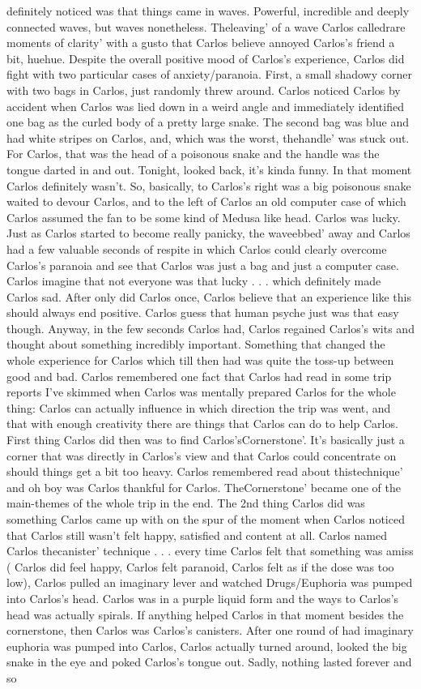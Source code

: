 \documentclass[12pt]{book}
\begin{document}
definitely noticed was that things came in waves. Powerful, incredible and deeply connected waves, but waves nonetheless. Theleaving' of a wave Carlos calledrare moments of clarity' with a gusto that Carlos believe annoyed Carlos's friend a bit, huehue. Despite the overall positive mood of Carlos's experience, Carlos did fight with two particular cases of anxiety/paranoia. First, a small shadowy corner with two bags in Carlos, just randomly threw around. Carlos noticed Carlos by accident when Carlos was lied down in a weird angle and immediately identified one bag as the curled body of a pretty large snake. The second bag was blue and had white stripes on Carlos, and, which was the worst, thehandle' was stuck out. For Carlos, that was the head of a poisonous snake and the handle was the tongue darted in and out. Tonight, looked back, it's kinda funny. In that moment Carlos definitely wasn't. So, basically, to Carlos's right was a big poisonous snake waited to devour Carlos, and to the left of Carlos an old computer case of which Carlos assumed the fan to be some kind of Medusa like head. Carlos was lucky. Just as Carlos started to become really panicky, the waveebbed' away and Carlos had a few valuable seconds of respite in which Carlos could clearly overcome Carlos's paranoia and see that Carlos was just a bag and just a computer case. Carlos imagine that not everyone was that lucky . . .  which definitely made Carlos sad. After only did Carlos once, Carlos believe that an experience like this should always end positive. Carlos guess that human psyche just was that easy though. Anyway, in the few seconds Carlos had, Carlos regained Carlos's wits and thought about something incredibly important. Something that changed the whole experience for Carlos which till then had was quite the toss-up between good and bad. Carlos remembered one fact that Carlos had read in some trip reports I've skimmed when Carlos was mentally prepared Carlos for the whole thing: Carlos can actually influence in which direction the trip was went, and that with enough creativity there are things that Carlos can do to help Carlos. First thing Carlos did then was to find Carlos'sCornerstone'. It's basically just a corner that was directly in Carlos's view and that Carlos could concentrate on should things get a bit too heavy. Carlos remembered read about thistechnique' and oh boy was Carlos thankful for Carlos. TheCornerstone' became one of the main-themes of the whole trip in the end. The 2nd thing Carlos did was something Carlos came up with on the spur of the moment when Carlos noticed that Carlos still wasn't felt happy, satisfied and content at all. Carlos named Carlos thecanister' technique . . .  every time Carlos felt that something was amiss ( Carlos did feel happy, Carlos felt paranoid, Carlos felt as if the dose was too low), Carlos pulled an imaginary lever and watched Drugs/Euphoria was pumped into Carlos's head. Carlos was in a purple liquid form and the ways to Carlos's head was actually spirals. If anything helped Carlos in that moment besides the cornerstone, then Carlos was Carlos's canisters. After one round of had imaginary euphoria was pumped into Carlos, Carlos actually turned around, looked the big snake in the eye and poked Carlos's tongue out. Sadly, nothing lasted forever and so 
\end{document}

